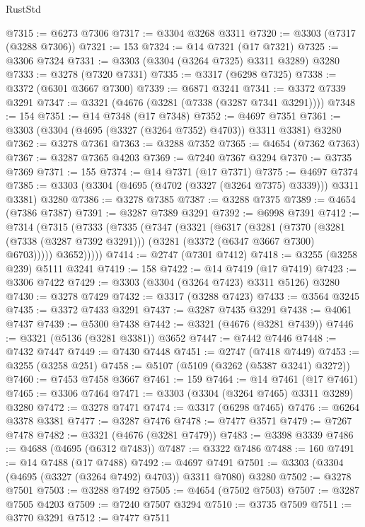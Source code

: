 \begin{lexlean}{RustStd}
\begin{coremodule}
@7315 := @6273 @7306
@7317 := @3304 @3268 @3311
@7320 := @3303 (@7317 (@3288 @7306))
@7321 := 153
@7324 := @14 @7321 (@17 @7321)
@7325 := @3306 @7324
@7331 := @3303 (@3304 (@3264 @7325) @3311 @3289) @3280
@7333 := @3278 (@7320 @7331)
@7335 := @3317 (@6298 @7325)
@7338 := @3372 (@6301 @3667 @7300)
@7339 := @6871 @3241
@7341 := @3372 @7339 @3291
@7347 := @3321 (@4676 (@3281 (@7338 (@3287 @7341 @3291))))
@7348 := 154
@7351 := @14 @7348 (@17 @7348)
@7352 := @4697 @7351
@7361 := @3303 (@3304 (@4695 (@3327 (@3264 @7352) @4703)) @3311 @3381) @3280
@7362 := @3278 @7361
@7363 := @3288 @7352
@7365 := @4654 (@7362 @7363)
@7367 := @3287 @7365 @4203
@7369 := @7240 @7367 @3294
@7370 := @3735 @7369
@7371 := 155
@7374 := @14 @7371 (@17 @7371)
@7375 := @4697 @7374
@7385 := @3303 (@3304 (@4695 (@4702 (@3327 (@3264 @7375) @3339))) @3311 @3381) @3280
@7386 := @3278 @7385
@7387 := @3288 @7375
@7389 := @4654 (@7386 @7387)
@7391 := @3287 @7389 @3291
@7392 := @6998 @7391
@7412 := @7314
    (@7315
      (@7333
        (@7335
          (@7347
            (@3321
              (@6317
                (@3281
                  (@7370
                    (@3281 (@7338 (@3287 @7392 @3291)))
                    (@3281 (@3372 (@6347 @3667 @7300) @6703)))))
              @3652)))))
@7414 := @2747 (@7301 @7412)
@7418 := @3255 (@3258 @239) @5111 @3241
@7419 := 158
@7422 := @14 @7419 (@17 @7419)
@7423 := @3306 @7422
@7429 := @3303 (@3304 (@3264 @7423) @3311 @5126) @3280
@7430 := @3278 @7429
@7432 := @3317 (@3288 @7423)
@7433 := @3564 @3245
@7435 := @3372 @7433 @3291
@7437 := @3287 @7435 @3291
@7438 := @4061 @7437
@7439 := @5300 @7438
@7442 := @3321 (@4676 (@3281 @7439))
@7446 := @3321 (@5136 (@3281 @3381)) @3652
@7447 := @7442 @7446
@7448 := @7432 @7447
@7449 := @7430 @7448
@7451 := @2747 (@7418 @7449)
@7453 := @3255 (@3258 @251)
@7458 := @5107 (@5109 (@3262 (@5387 @3241) @3272))
@7460 := @7453 @7458 @3667
@7461 := 159
@7464 := @14 @7461 (@17 @7461)
@7465 := @3306 @7464
@7471 := @3303 (@3304 (@3264 @7465) @3311 @3289) @3280
@7472 := @3278 @7471
@7474 := @3317 (@6298 @7465)
@7476 := @6264 @3378 @3381
@7477 := @3287 @7476
@7478 := @7477 @3571
@7479 := @7267 @7478
@7482 := @3321 (@4676 (@3281 @7479))
@7483 := @3398 @3339
@7486 := @4688 (@4695 (@6312 @7483))
@7487 := @3322 @7486
@7488 := 160
@7491 := @14 @7488 (@17 @7488)
@7492 := @4697 @7491
@7501 := @3303 (@3304 (@4695 (@3327 (@3264 @7492) @4703)) @3311 @7080) @3280
@7502 := @3278 @7501
@7503 := @3288 @7492
@7505 := @4654 (@7502 @7503)
@7507 := @3287 @7505 @4203
@7509 := @7240 @7507 @3294
@7510 := @3735 @7509
@7511 := @3770 @3291
@7512 := @7477 @7511

\end{coremodule}
\end{lexlean}
